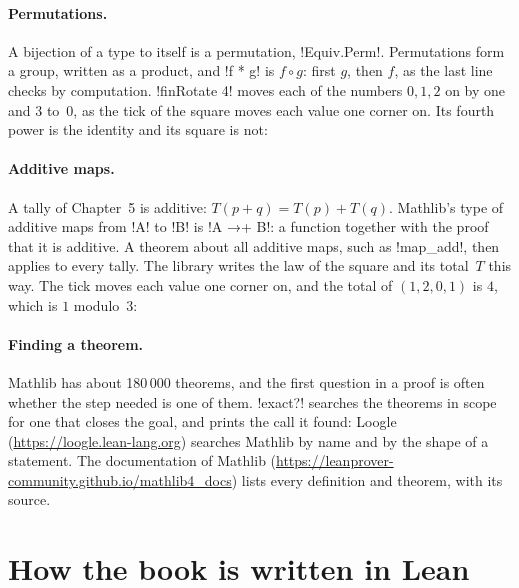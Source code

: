 \paragraph{Permutations.}
A bijection of a type to itself is a permutation, \li!Equiv.Perm!.
Permutations form a group, written as a product, and \li!f * g! is
$f\circ g$: first $g$, then $f$, as the last line checks by computation.
\li!finRotate 4! moves each of the numbers $0,1,2$ on by one and $3$ to~$0$,
as the tick of the square moves each value one corner on. Its fourth power
is the identity and its square is not:

\paragraph{Additive maps.}
A tally of Chapter~5 is additive: $T(p+q)=T(p)+T(q)$. Mathlib's type of
additive maps from \li!A! to \li!B! is \li!A →+ B!: a function together with
the proof that it is additive. A theorem about all additive maps, such as
\li!map_add!, then applies to every tally. The library writes the law of the
square and its total~$T$ this way. The tick moves each value one corner on,
and the total of $(1,2,0,1)$ is $4$, which is $1$ modulo~$3$:

\paragraph{Finding a theorem.}
Mathlib has about 180\,000 theorems, and the first question
in a proof is often whether the step needed is one of them. \li!exact?!
searches the theorems in scope for one that closes the goal, and prints the
call it found:
Loogle (\url{https://loogle.lean-lang.org}) searches Mathlib by name and by
the shape of a statement. The documentation of Mathlib
(\url{https://leanprover-community.github.io/mathlib4_docs}) lists every
definition and theorem, with its source.

\section*{How the book is written in Lean}

